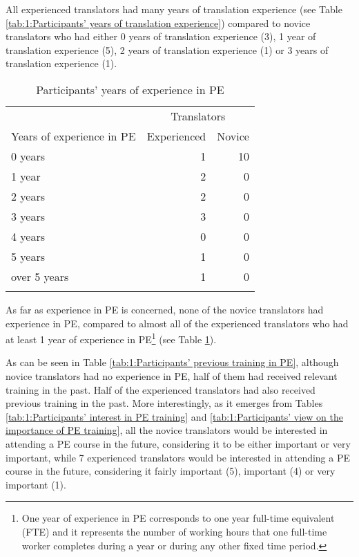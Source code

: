 \documentclass[output=paper]{langscibook}
\begin{document}
All experienced translators had many years of translation experience (see Table \ref{tab:1:Participants’ years of translation experience}) compared to novice translators who had either 0 years of translation experience (3), 1 year of translation experience (5), 2 years of translation experience (1) or 3 years of translation experience (1).\pagebreak

\begin{table}
\caption{Participants’ years of experience in PE}
\label{tab:1:Participants’ years of experience in PE}
 \begin{tabularx}{.75\textwidth}{Xrr}
  \lsptoprule
                            & \multicolumn{2}{c}{Translators}\\\cmidrule(lr){2-3}
 Years of experience in PE  & Experienced & Novice\\            
  \midrule
  0 years & 1 & 10\\
  1 year & 2 & 0\\
  2 years & 2 & 0\\
  3 years  & 3 & 0\\
  4 years   & 0 & 0\\
  5 years   &  1  & 0\\
  over 5 years   & 1 &0\\
  \lspbottomrule
 \end{tabularx}
\end{table}

As far as experience in PE is concerned, none of the novice translators had experience in PE, compared to almost all of the experienced translators who had at least 1 year of experience in PE{\footnote{One year of experience in PE corresponds to one year full-time equivalent (FTE) and it represents the number of working hours that one full-time worker completes during a year or during any other fixed time period.}} (see Table \ref{tab:1:Participants’ years of experience in PE}).

As can be seen in Table \ref{tab:1:Participants’ previous training in PE}, although novice translators had no experience in PE, half of them had received relevant training in the past. Half of the experienced translators had also received previous training in the past. More interestingly, as it emerges from Tables \ref{tab:1:Participants’ interest in PE training} and \ref{tab:1:Participants’ view on the importance of PE training}, all the novice translators would be interested in attending a PE course in the future, considering it to be either important or very important, while 7 experienced translators would be interested in attending a PE course in the future, considering it fairly important (5), important (4) or very important (1).
\end{document}

